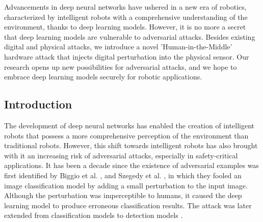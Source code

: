 Advancements in deep neural networks have ushered in a new era of robotics, characterized by intelligent robots with a comprehensive understanding of the environment, thanks to deep learning models. However, it is no more a secret that deep learning models are vulnerable to adversarial attacks. Besides existing digital and physical attacks, we introduce a novel 'Human-in-the-Middle' hardware attack that injects digital perturbation into the physical sensor. Our research opens up new possibilities for adversarial attacks, and we hope to embrace deep learning models securely for robotic applications.




\subsection{Introduction}

The development of deep neural networks has enabled the creation of intelligent robots that possess a more comprehensive perception of the environment than traditional robots. However, this shift towards intelligent robots has also brought with it an increasing risk of adversarial attacks, especially in safety-critical applications.  It has been a decade since the existence of adversarial examples was first identified by Biggio et al. \cite{biggio2013evasion}, and Szegedy et al. \cite{szegedy2013intriguing}, in which they fooled an image classification model by adding a small perturbation to the input image.  Although the perturbation was imperceptible to humans, it caused the deep learning model to produce erroneous classification results. The attack was later extended from classification models to detection models \cite{han2023detection, LuSFF17}. 

